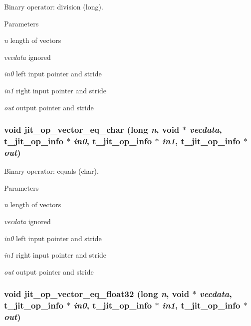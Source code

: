 Binary operator: division (long). 
\begin{DoxyParams}{Parameters}
\item[{\em n}]length of vectors \item[{\em vecdata}]ignored \item[{\em in0}]left input pointer and stride \item[{\em in1}]right input pointer and stride \item[{\em out}]output pointer and stride \end{DoxyParams}
\hypertarget{group__opvecmod_ga728da0f73896508903d8be5d225627e1}{
\subsubsection[{jit\_\-op\_\-vector\_\-eq\_\-char}]{\setlength{\rightskip}{0pt plus 5cm}void jit\_\-op\_\-vector\_\-eq\_\-char (long {\em n}, \/  void $\ast$ {\em vecdata}, \/  {\bf t\_\-jit\_\-op\_\-info} $\ast$ {\em in0}, \/  {\bf t\_\-jit\_\-op\_\-info} $\ast$ {\em in1}, \/  {\bf t\_\-jit\_\-op\_\-info} $\ast$ {\em out})}}
\label{group__opvecmod_ga728da0f73896508903d8be5d225627e1}


Binary operator: equals (char). 
\begin{DoxyParams}{Parameters}
\item[{\em n}]length of vectors \item[{\em vecdata}]ignored \item[{\em in0}]left input pointer and stride \item[{\em in1}]right input pointer and stride \item[{\em out}]output pointer and stride \end{DoxyParams}
\hypertarget{group__opvecmod_ga606351534a911aea16e44faa411f2e01}{
\subsubsection[{jit\_\-op\_\-vector\_\-eq\_\-float32}]{\setlength{\rightskip}{0pt plus 5cm}void jit\_\-op\_\-vector\_\-eq\_\-float32 (long {\em n}, \/  void $\ast$ {\em vecdata}, \/  {\bf t\_\-jit\_\-op\_\-info} $\ast$ {\em in0}, \/  {\bf t\_\-jit\_\-op\_\-info} $\ast$ {\em in1}, \/  {\bf t\_\-jit\_\-op\_\-info} $\ast$ {\em out})}}
\label{group__opvecmod_ga606351534a911aea16e44faa411f2e01}


